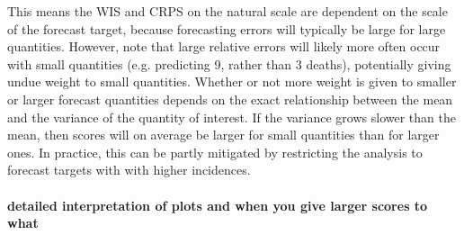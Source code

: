 \documentclass{article}
\begin{document}
This means the WIS and CRPS on the natural scale are dependent on the scale of the forecast target, because forecasting errors will typically be large for large quantities. 
However, note that large relative errors will likely more often occur with small quantities (e.g. predicting 9, rather than 3 deaths), potentially giving undue weight to small quantities. Whether or not more weight is given to smaller or larger forecast quantities depends on the exact relationship between the mean and the variance of the quantity of interest. If the variance grows slower than the mean, then scores will on average be larger for small quantities than for larger ones. In practice, this can be partly mitigated by restricting the analysis to forecast targets with with higher incidences. 








\paragraph{detailed interpretation of plots and when you give larger scores to what}
\end{document}
